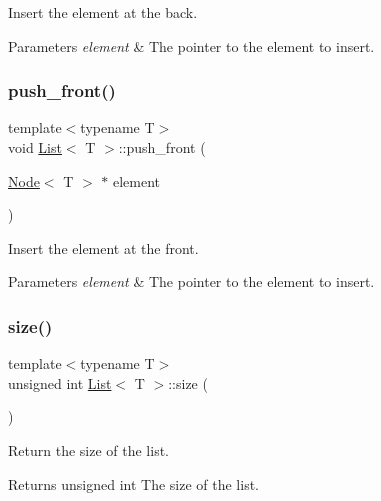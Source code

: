 Insert the element at the back. 


\begin{DoxyParams}{Parameters}
{\em element} & The pointer to the element to insert. \\
\hline
\end{DoxyParams}
\mbox{\label{class_list_aeb009afd4f0f626603455d5ee9e3dfc3}} 
\subsubsection{\texorpdfstring{push\+\_\+front()}{push\_front()}}
{\footnotesize\ttfamily template$<$typename T$>$ \\
void \hyperlink{class_list}{List}$<$ T $>$\+::push\+\_\+front (\begin{DoxyParamCaption}\item[{\hyperlink{struct_node}{Node}$<$ T $>$ $\ast$}]{element }\end{DoxyParamCaption})\hspace{0.3cm}{\ttfamily [inline]}}



Insert the element at the front. 


\begin{DoxyParams}{Parameters}
{\em element} & The pointer to the element to insert. \\
\hline
\end{DoxyParams}
\mbox{\label{class_list_ad908ab5cf19370fcdf61cf1927e5e8f5}} 
\subsubsection{\texorpdfstring{size()}{size()}}
{\footnotesize\ttfamily template$<$typename T$>$ \\
unsigned int \hyperlink{class_list}{List}$<$ T $>$\+::size (\begin{DoxyParamCaption}{ }\end{DoxyParamCaption})\hspace{0.3cm}{\ttfamily [inline]}}



Return the size of the list. 

\begin{DoxyReturn}{Returns}
unsigned int The size of the list. 
\end{DoxyReturn}


